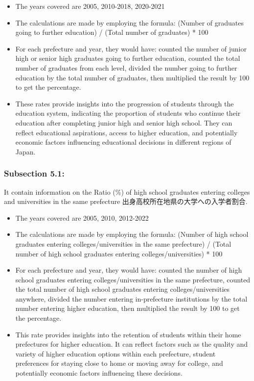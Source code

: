 \documentclass[
  12pt,
  letterpaper,
  DIV=11,
  numbers=noendperiod]{scrartcl}
\begin{document}
\begin{itemize}
\item
  The years covered are 2005, 2010-2018, 2020-2021
\item
  The calculations are made by employing the formula: (Number of
  graduates going to further education) / (Total number of graduates) *
  100
\item
  For each prefecture and year, they would have: counted the number of
  junior high or senior high graduates going to further education,
  counted the total number of graduates from each level, divided the
  number going to further education by the total number of graduates,
  then multiplied the result by 100 to get the percentage.
\item
  These rates provide insights into the progression of students through
  the education system, indicating the proportion of students who
  continue their education after completing junior high and senior high
  school. They can reflect educational aspirations, access to higher
  education, and potentially economic factors influencing educational
  decisions in different regions of Japan.
\end{itemize}

\hypertarget{subsection-5.1}{%
\subsubsection{Subsection 5.1:}\label{subsection-5.1}}

It contain information on the Ratio (\%) of high school graduates
entering colleges and universities in the same prefecture
出身高校所在地県の大学への入学者割合.

\begin{itemize}
\item
  The years covered are 2005, 2010, 2012-2022
\item
  The calculations are made by employing the formula: (Number of high
  school graduates entering colleges/universities in the same
  prefecture) / (Total number of high school graduates entering
  colleges/universities) * 100
\item
  For each prefecture and year, they would have: counted the number of
  high school graduates entering colleges/universities in the same
  prefecture, counted the total number of high school graduates entering
  colleges/universities anywhere, divided the number entering
  in-prefecture institutions by the total number entering higher
  education, then multiplied the result by 100 to get the percentage.
\item
  This rate provides insights into the retention of students within
  their home prefectures for higher education. It can reflect factors
  such as the quality and variety of higher education options within
  each prefecture, student preferences for staying close to home or
  moving away for college, and potentially economic factors influencing
  these decisions.
\end{itemize}
\end{document}
